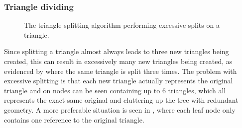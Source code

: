 \subsubsection{Triangle dividing}

\begin{figure}
  \centering
  \caption[Excessive splitting of a triangle.]{The triangle splitting
    algorithm performing excessive splits on a triangle.}
  \label{fig:excessiveSplitting}
\end{figure}

Since splitting a triangle almost always leads to three new triangles
being created, this can result in excessively many new triangles being
created, as evidenced by  where the
same triangle is split three times. The problem with excessive
splitting is that each new triangle actually represents the original
triangle and on  nodes can be seen
containing up to 6 triangles, which all represents the exact same
original and cluttering up the tree with redundant geometry. A more
preferable situation is seen in , where each leaf
node only contains one reference to the original triangle.

